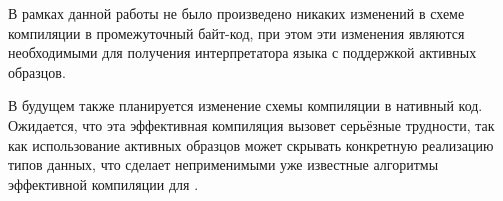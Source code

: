 В рамках данной работы не было произведено никаких изменений в схеме компиляции в промежуточный байт-код, при этом эти изменения являются необходимыми для получения интерпретатора языка \ocaml{} с поддержкой активных образцов. 

В будущем также планируется изменение схемы компиляции в нативный код. Ожидается, что эта эффективная компиляция вызовет серьёзные трудности, так как использование активных образцов может скрывать конкретную реализацию типов данных, что сделает неприменимыми уже известные алгоритмы~\cite{maranget2008decisiontrees,fessant2001optimizing} эффективной компиляции для \ocaml{}.




\renewcommand\refname{Список литературы}
%

